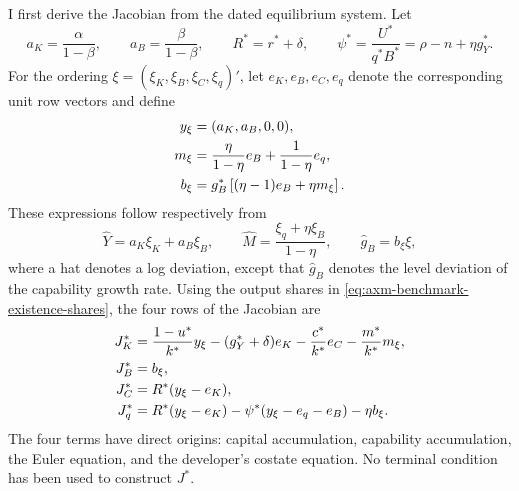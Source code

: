 I first derive the Jacobian from the dated equilibrium system. Let
\begin{equation}
 a_K=\frac{\alpha}{1-\beta},\qquad
 a_B=\frac{\beta}{1-\beta},\qquad
 R^*=r^*+\delta,
 \qquad
 \psi^*=\frac{U^*}{q^*B^*}
 =\rho-n+\eta g_Y^*.
 \label{eq:axm-saddle-jacobian-definitions}
\end{equation}
For the ordering
\(\xi=(\xi_K,\xi_B,\xi_C,\xi_q)'\), let \(e_K,e_B,e_C,e_q\)
denote the corresponding unit row vectors and define
\begin{align}
 y_\xi&=(a_K,a_B,0,0),\notag\\
 m_\xi&=\frac{\eta}{1-\eta}e_B
       +\frac{1}{1-\eta}e_q,\notag\\
 b_\xi&=g_B^*\left[(\eta-1)e_B+\eta m_\xi\right].
 \label{eq:axm-saddle-linear-blocks}
\end{align}
These expressions follow respectively from
\begin{equation}
 \widehat Y=a_K\xi_K+a_B\xi_B,\qquad
 \widehat M=\frac{\xi_q+\eta\xi_B}{1-\eta},\qquad
 \widehat g_B=b_\xi\xi,
 \label{eq:axm-saddle-log-linear-identities}
\end{equation}
where a hat denotes a log deviation, except that
\(\widehat g_B\) denotes the level deviation of the capability growth rate.
Using the output shares in
\eqref{eq:axm-benchmark-existence-shares}, the four rows of the Jacobian are
\begin{align}
 J_K^*&=\frac{1-u^*}{k^*}y_\xi
 -(g_Y^*+\delta)e_K-\frac{c^*}{k^*}e_C
 -\frac{m^*}{k^*}m_\xi,\notag\\
 J_B^*&=b_\xi,\notag\\
 J_C^*&=R^*(y_\xi-e_K),\notag\\
 J_q^*&=R^*(y_\xi-e_K)
 -\psi^*(y_\xi-e_q-e_B)-\eta b_\xi.
 \label{eq:axm-saddle-jacobian}
\end{align}
The four terms have direct origins: capital accumulation, capability
accumulation, the Euler equation, and the developer's costate equation. No
terminal condition has been used to construct \(J^*\).

